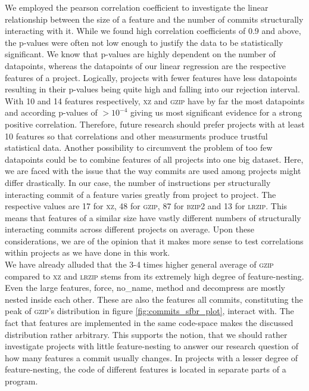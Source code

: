 We employed the pearson correlation coefficient to investigate the linear relationship between the size of a feature and the number of commits structurally interacting with it.
While we found high correlation coefficients of 0.9 and above, the p-values were often not low enough to justify the data to be statistically significant.
We know that p-values are highly dependent on the number of datapoints, whereas the datapoints of our linear regression are the respective features of a project.
Logically, projects with fewer features have less datapoints resulting in their p-values being quite high and falling into our rejection interval.
With 10 and 14 features respectively, \textsc{xz} and \textsc{gzip} have by far the most datapoints and according p-values of $>10^{-4}$ giving us most significant evidence for a strong positive correlation. 
Therefore, future research should prefer projects with at least 10 features so that correlations and other measurments produce trustful statistical data. 
Another possibility to circumvent the problem of too few datapoints could be to combine features of all projects into one big dataset.
Here, we are faced with the issue that the way commits are used among projects might differ drastically. 
In our case, the number of instructions per structurally interacting commit of a feature varies greatly from project to project.
The respective values are 17 for \textsc{xz}, 48 for \textsc{gzip}, 87 for \textsc{bzip2} and 13 for \textsc{lrzip}.
This means that features of a similar size have vastly different numbers of structurally interacting commits across different projects on average.
Upon these considerations, we are of the opinion that it makes more sense to test correlations within projects as we have done in this work.\\
We have already alluded that the 3-4 times higher general average of \textsc{gzip} compared to \textsc{xz} and \textsc{lrzip} stems from its extremely high degree of feature-nesting.
Even the large features, \textsf{force}, \textsf{no\_name}, \textsf{method} and \textsf{decompress} are mostly nested inside each other.
These are also the features all commits, constituting the peak of \textsc{gzip}'s distribution in figure \ref{fig:commits_sfbr_plot}, interact with. 
The fact that features are implemented in the same code-space makes the discussed distribution rather arbitrary.
This supports the notion, that we should rather investigate projects with little feature-nesting to answer our research question of how many features a commit usually changes.
In projects with a lesser degree of feature-nesting, the code of different features is located in separate parts of a program.
